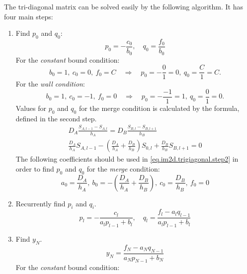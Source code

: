 \documentclass[a4paper,10pt]{article}
\begin{document}
The tri-diagonal matrix can be solved easily by the following algorithm.
It has four main steps:
\begin{enumerate}
  \item 
    Find $p_0$ and $q_0$:
    \begin{equation}
        p_0 = -\frac{c_0}{b_0},\quad
        q_0 =  \frac{f_0}{b_0}
    \end{equation}
    For the \emph{constant} bound condition:
    \begin{equation}
        b_0 = 1,\ c_0 = 0,\ f_0 = C
        \quad\Rightarrow\quad
        p_0 = -\frac{0}{1} = 0,\
        q_0 = \frac{C}{1} = C.
    \end{equation}
    For the \emph{wall condition}:
    \begin{equation}
        b_0 = 1,\ c_0 = -1,\ f_0 = 0
        \quad\Rightarrow\quad
        p_0 = -\frac{-1}{1} = 1,\
        q_0 = \frac{0}{1} = 0.
    \end{equation}
    Values for $p_0$ and $q_0$ for the merge condition is calculated
    by the formula, defined in the second step.
    \begin{gather}
        D_A \frac{S_{A,l-1} - S_{A,l}}{h_A} =
        D_B \frac{S_{B,l} - S_{B,l+1}}{h_B}
        \\
        \frac{D_A}{h_A} S_{A,l-1} -
        \left(\frac{D_A}{h_A} + \frac{D_B}{h_B}\right)S_{0,l} +
        \frac{D_B}{h_B} S_{B,l+1} = 0
    \end{gather}
    The following coefficients should be used in \eqref{eq.im2d.trigiagonal.step2}
    in order to find $p_0$ and $q_0$ for the \emph{merge} condition:
    \begin{equation}
        a_0 = \frac{D_A}{h_A},\
        b_0 = -\left(\frac{D_A}{h_A} + \frac{D_B}{h_B}\right),\
        c_0 = \frac{D_B}{h_B},\
        f_0 = 0
    \end{equation}
  \item Recurrently find $p_i$ and $q_i$.
    \begin{equation}\label{eq.im2d.trigiagonal.step2}
        p_l = -\frac{c_l}{a_l p_{l-1} + b_l},\quad
        q_l =  \frac{f_l - a_l q_{l-1}}{a_l p_{l-1} + b_l}
    \end{equation}
  \item Find $y_N$.
    \begin{equation}
        y_N = \frac{f_N - a_N q_{N-1}}{a_N p_{N-1} + b_N}
    \end{equation}
    For the \emph{constant} bound condition:
    \begin{equation}

\end{equation}
\end{enumerate}
\end{document}
